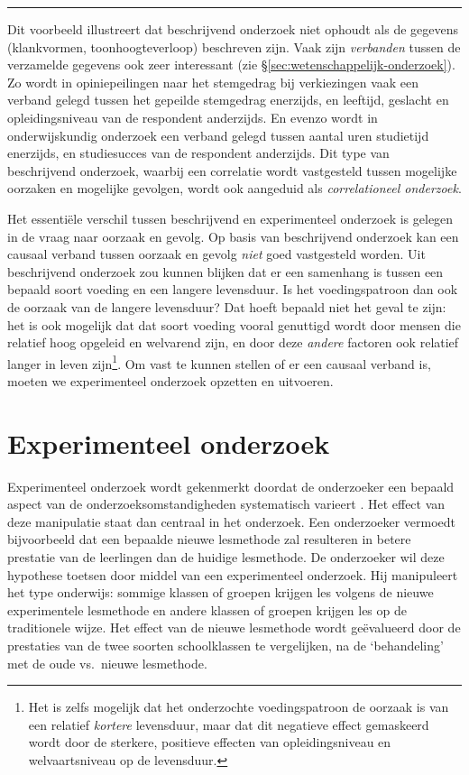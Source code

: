 \documentclass[
]{book}
\begin{document}
\begin{center}\rule{0.5\linewidth}{0.5pt}\end{center}

Dit voorbeeld illustreert dat beschrijvend onderzoek niet ophoudt als de
gegevens (klankvormen, toonhoogteverloop) beschreven zijn. Vaak zijn
\emph{verbanden} tussen de verzamelde gegevens ook zeer interessant (zie §\ref{sec:wetenschappelijk-onderzoek}).
Zo wordt in opiniepeilingen naar het stemgedrag bij verkiezingen vaak
een verband gelegd tussen het gepeilde stemgedrag enerzijds, en
leeftijd, geslacht en opleidingsniveau van de respondent anderzijds. En
evenzo wordt in onderwijskundig onderzoek een verband gelegd tussen
aantal uren studietijd enerzijds, en studiesucces van de respondent
anderzijds. Dit type van beschrijvend onderzoek, waarbij een correlatie
wordt vastgesteld tussen mogelijke oorzaken en mogelijke gevolgen, wordt
ook aangeduid als \emph{correlationeel onderzoek}.

Het essentiële verschil tussen beschrijvend en experimenteel onderzoek
is gelegen in de vraag naar oorzaak en gevolg. Op basis van beschrijvend
onderzoek kan een causaal verband tussen oorzaak en gevolg \emph{niet} goed
vastgesteld worden. Uit beschrijvend onderzoek zou kunnen blijken dat er
een samenhang is tussen een bepaald soort voeding en een langere
levensduur. Is het voedingspatroon dan ook de oorzaak van de langere
levensduur? Dat hoeft bepaald niet het geval te zijn: het is ook
mogelijk dat dat soort voeding vooral genuttigd wordt door mensen die
relatief hoog opgeleid en welvarend zijn, en door deze \emph{andere} factoren
ook relatief langer in leven zijn\footnote{Het is zelfs mogelijk dat het onderzochte voedingspatroon de oorzaak is van een relatief \emph{kortere} levensduur, maar dat dit negatieve effect gemaskeerd wordt door de sterkere, positieve effecten van opleidingsniveau en welvaartsniveau op de levensduur.}. Om vast te kunnen stellen of er
een causaal verband is, moeten we experimenteel onderzoek opzetten en
uitvoeren.

\hypertarget{sec:experimenteel-onderzoek}{%
\section{Experimenteel onderzoek}\label{sec:experimenteel-onderzoek}}

Experimenteel onderzoek wordt gekenmerkt doordat de onderzoeker een
bepaald aspect van de onderzoeksomstandigheden systematisch varieert
\citep{SCC02}. Het effect van deze manipulatie staat dan centraal in het
onderzoek. Een onderzoeker vermoedt bijvoorbeeld dat een bepaalde nieuwe
lesmethode zal resulteren in betere prestatie van de leerlingen dan de
huidige lesmethode. De onderzoeker wil deze hypothese toetsen door
middel van een experimenteel onderzoek. Hij manipuleert het type
onderwijs: sommige klassen of groepen krijgen les volgens de nieuwe
experimentele lesmethode en andere klassen of groepen krijgen les op de
traditionele wijze. Het effect van de nieuwe lesmethode wordt
geëvalueerd door de prestaties van de twee soorten schoolklassen te
vergelijken, na de `behandeling' met de oude vs.~nieuwe lesmethode.
\end{document}
